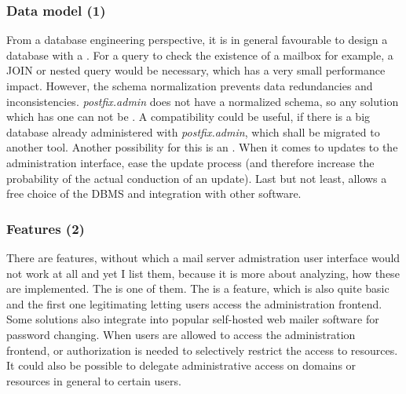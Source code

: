 \documentclass[12pt,a4paper]{scrartcl}
\begin{document}
			\subsubsection*{Data model (1)}
				From a database engineering perspective, it is in general
				favourable to design a database with a  \cite{dbnorm}. For a query to
				check the existence of a mailbox for example, a JOIN or nested
				query would be necessary, which has a very small performance
				impact. However, the schema normalization prevents data
				redundancies and inconsistencies. \emph{postfix.admin} does not
				have a normalized schema, so any solution which has one can not
				be . A
				compatibility could be useful, if there is a big database
				already administered with \emph{postfix.admin}, which shall be
				migrated to another tool. Another possibility for this is an
				. When it comes
				to updates to the administration interface,  ease the update process
				(and therefore increase the probability of the actual
				conduction of an update). Last but not least,  allows a free choice of the \ac{DBMS} and
				integration with other software.

			\subsubsection*{Features (2)}
				There are features, without which a mail server admistration
				user interface would not work at all and yet I list them,
				because it is more about analyzing, how these are implemented.
				The  is
				one of them. The  is a feature, which is also quite basic and the
				first one legitimating letting users access the administration
				frontend. Some solutions also integrate into popular
				self-hosted web mailer software for password changing. When
				users are allowed to access the administration frontend,
				 or authorization is needed to
				selectively restrict the access to resources. It could also be
				possible to delegate administrative access on domains or
				resources in general to certain users.
				\s
\end{document}
